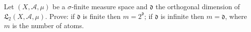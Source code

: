Let $(X, \mathcal{A}, \mu)$ be a $\sigma$-finite measure space and $\mathfrak{d}$ the orthogonal dimension of $\mathfrak{L}_2(X, \mathcal{A}, \mu)$. Prove: if $\mathfrak{d}$ is finite then $m = 2^{\mathfrak{d}}$; if $\mathfrak{d}$ is infinite then $m = \mathfrak{d}$, where $m$ is the number of atoms.

